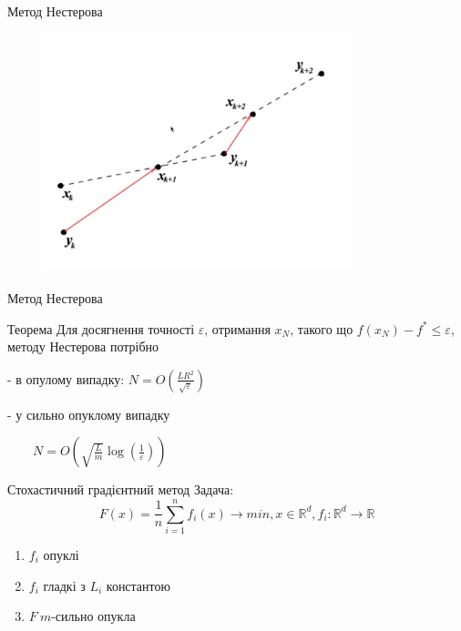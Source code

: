 \documentclass[a4paper, 14pt]{beamer}
\begin{document}
\begin{frame}{Метод Нестерова}
    \begin{figure}
        \includegraphics[width = 0.8\textwidth]{imgs/nesterov2.png}
    \end{figure}
\end{frame}

\begin{frame}{Метод Нестерова}
    \begin{theo}{Теорема}
        Для досягнення точності $\varepsilon$, отримання 
        $x_N$, такого що $f\left(x_N\right)-f^* \leq \varepsilon$, 
        методу Нестерова потрібно
        
        
        - в опулому випадку: 
        $N=O\left(\frac{L R^2}{\sqrt{\varepsilon}}\right)$


        - у сильно опуклому випадку 
        
        
        $\qquad N=O\left(\sqrt{\frac{L}{m}} \log 
        \left(\frac{1}{\varepsilon}\right)\right)$ 
    \end{theo}
\end{frame}

\begin{frame}{Стохастичний градієнтний метод}
    Задача: 
    $$ F(x) = \frac{1}{n} \sum_{i = 1}^{n}f_i(x) \rightarrow min, x \in 
    \mathbb{R}^d, f_i: \mathbb{R}^d \rightarrow \mathbb{R} $$
    \begin{enumerate}
        \item $f_i$ опуклі 
        \item $f_i$ гладкі з $L_i$ константою
        \item $F \ m$-сильно опукла
    \end{enumerate}
\end{frame}
\end{document}
